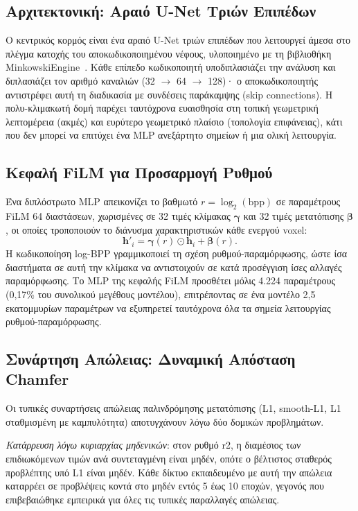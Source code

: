 \subsection{Αρχιτεκτονική: Αραιό U-Net Τριών Επιπέδων}

Ο κεντρικός κορμός είναι ένα αραιό U-Net τριών επιπέδων που λειτουργεί άμεσα
στο πλέγμα κατοχής του αποκωδικοποιημένου νέφους, υλοποιημένο με τη βιβλιοθήκη
MinkowskiEngine~\cite{choy2019minkowski}.
Κάθε επίπεδο κωδικοποιητή υποδιπλασιάζει την ανάλυση και διπλασιάζει τον αριθμό
καναλιών (32 $\to$ 64 $\to$ 128)· ο αποκωδικοποιητής αντιστρέφει αυτή τη διαδικασία
με συνδέσεις παράκαμψης (skip connections).
Η πολυ-κλιμακωτή δομή παρέχει ταυτόχρονα ευαισθησία στη τοπική γεωμετρική
λεπτομέρεια (ακμές) και ευρύτερο γεωμετρικό πλαίσιο (τοπολογία επιφάνειας),
κάτι που δεν μπορεί να επιτύχει ένα MLP ανεξάρτητο σημείων ή μια ολική λειτουργία.

\subsection{Κεφαλή FiLM για Προσαρμογή Ρυθμού}

Ένα διπλόστρωτο MLP απεικονίζει το βαθμωτό $r = \log_2(\mathrm{bpp})$ σε παραμέτρους
FiLM 64 διαστάσεων, χωρισμένες σε 32 τιμές κλίμακας $\boldsymbol{\gamma}$ και 32 τιμές
μετατόπισης $\boldsymbol{\beta}$, οι οποίες τροποποιούν το διάνυσμα χαρακτηριστικών
κάθε ενεργού voxel:
\[
  \mathbf{h}'_i = \boldsymbol{\gamma}(r) \odot \mathbf{h}_i + \boldsymbol{\beta}(r).
\]
Η κωδικοποίηση log-BPP γραμμικοποιεί τη σχέση ρυθμού-παραμόρφωσης, ώστε ίσα
διαστήματα σε αυτή την κλίμακα να αντιστοιχούν σε κατά προσέγγιση ίσες αλλαγές
παραμόρφωσης.
Το MLP της κεφαλής FiLM προσθέτει μόλις 4.224 παραμέτρους (0,17\% του συνολικού
μεγέθους μοντέλου), επιτρέποντας σε ένα μοντέλο 2,5 εκατομμυρίων παραμέτρων να
εξυπηρετεί ταυτόχρονα όλα τα σημεία λειτουργίας ρυθμού-παραμόρφωσης.

\subsection{Συνάρτηση Απώλειας: Δυναμική Απόσταση Chamfer}

Οι τυπικές συναρτήσεις απώλειας παλινδρόμησης μετατόπισης (L1, smooth-L1,
L1 σταθμισμένη με καμπυλότητα) αποτυγχάνουν λόγω δύο δομικών προβλημάτων.

\emph{Κατάρρευση λόγω κυριαρχίας μηδενικών}: στον ρυθμό r2, η διαμέσιος
των επιδιωκόμενων τιμών ανά συντεταγμένη είναι μηδέν, οπότε ο βέλτιστος σταθερός
προβλέπτης υπό L1 είναι μηδέν.
Κάθε δίκτυο εκπαιδευμένο με αυτή την απώλεια καταρρέει σε προβλέψεις κοντά στο
μηδέν εντός 5 έως 10 εποχών, γεγονός που επιβεβαιώθηκε εμπειρικά για όλες τις
τυπικές παραλλαγές απώλειας.

